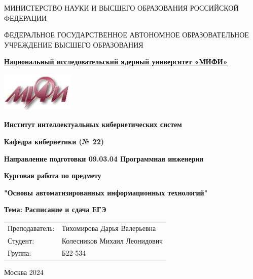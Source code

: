 \documentclass[a4paper,12pt]{article}
\begin{document}
\begin{titlepage}
    \begin{center}
        \vspace*{0.5cm}

        МИНИСТЕРСТВО НАУКИ И ВЫСШЕГО ОБРАЗОВАНИЯ РОССИЙСКОЙ ФЕДЕРАЦИИ

        \vspace{0.5cm}

        ФЕДЕРАЛЬНОЕ ГОСУДАРСТВЕННОЕ АВТОНОМНОЕ ОБРАЗОВАТЕЛЬНОЕ УЧРЕЖДЕНИЕ ВЫСШЕГО ОБРАЗОВАНИЯ

        \vspace{1cm}

        \textbf{\underline{Национальный исследовательский ядерный университет «МИФИ»}}

        \vspace{0.5cm}

    \end{center}
    \hspace{2cm}\includegraphics[width=3.5cm,height=1.9cm]{image1.png}
    \begin{center}
        \vspace{1cm}

        \textbf{Институт интеллектуальных кибернетических систем}

        \vspace{0.5cm}

        \textbf{Кафедра кибернетики (№ 22)}

        \vspace{0.5cm}

        \textbf{Направление подготовки 09.03.04 Программная инженерия}

        \vspace{2cm}

        \textbf{Курсовая работа по предмету}

        \vspace{0.5cm}

        \textbf{"Основы автоматизированных информационных технологий"}

        \vspace{2cm}

        \textbf{Тема: \guillemotleft Расписание и сдача ЕГЭ\guillemotright}

        \vspace{1cm}

        \begin{tabular}{ll}
            Преподаватель: & Тихомирова Дарья Валерьевна  \\
            Студент:       & Колесников Михаил Леонидович \\
            Группа:        & Б22-534                      \\
        \end{tabular}

        \vfill

        Москва 2024
    \end{center}
\end{titlepage}
\end{document}
